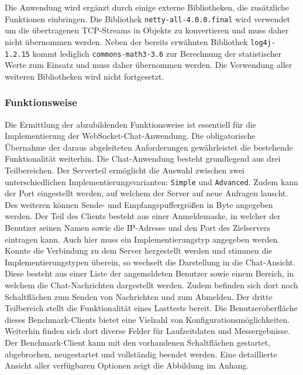 \documentclass[11pt,a4paper,titlepage]{scrartcl}
\numberwithin{equation}{section}
\begin{document}
\noindent Die Anwendung wird ergänzt durch einige externe Bibliotheken, die zusätzliche Funktionen einbringen. Die Bibliothek \texttt{netty-all-4.0.0.final} wird verwendet um die übertragenen TCP-Streams in Objekte zu konvertieren und muss daher nicht übernommen werden. Neben der bereits erwähnten Bibliothek \texttt{log4j-1.2.15} kommt lediglich \texttt{commons-math3-3.6} zur Berechnung der statistischer Werte zum Einsatz und muss daher übernommen werden. Die Verwendung aller weiteren Bibliotheken wird nicht fortgesetzt.

\subsubsection{Funktionsweise}
Die Ermittlung der abzubildenden Funktionsweise ist essentiell für die Implementierung der WebSocket-Chat-Anwendung. Die obligatorische Übernahme der daraus abgeleiteten Anforderungen gewährleistet die bestehende Funktionalität weiterhin. Die Chat-Anwendung besteht grundlegend aus drei Teilbereichen. Der Serverteil ermöglicht die Auswahl zwischen zwei unterschiedlichen Implementierungsvarianten: \texttt{Simple} und \texttt{Advanced}. Zudem kann der Port eingestellt werden, auf welchem der Server auf neue Anfragen lauscht. Des weiteren können Sende- und Empfangspuffergrößen in Byte angegeben werden. Der Teil des Clients besteht aus einer Anmeldemaske, in welcher der Benutzer seinen Namen sowie die IP-Adresse und den Port des Zielservers eintragen kann. Auch hier muss ein Implementierungstyp angegeben werden. Konnte die Verbindung zu dem Server hergestellt werden und stimmen die Implementierungstypen überein, so wechselt die Darstellung in die Chat-Ansicht. Diese besteht aus einer Liste der angemeldeten Benutzer sowie einem Bereich, in welchem die Chat-Nachrichten dargestellt werden. Zudem befinden sich dort noch Schaltflächen zum Senden von Nachrichten und zum Abmelden. Der dritte Teilbereich stellt die Funktionalität eines Lasttests bereit. Die Benutzeroberfläche dieses Benchmark-Clients bietet eine Vielzahl von Konfigurationsmöglichkeiten. Weiterhin finden sich dort diverse Felder für Laufzeitdaten und Messergebnisse. Der Benchmark-Client kann mit den vorhandenen Schaltflächen gestartet, abgebrochen, neugestartet und vollständig beendet werden. Eine detaillierte Ansicht aller verfügbaren Optionen zeigt die Abbildung im Anhang.\\
\end{document}
